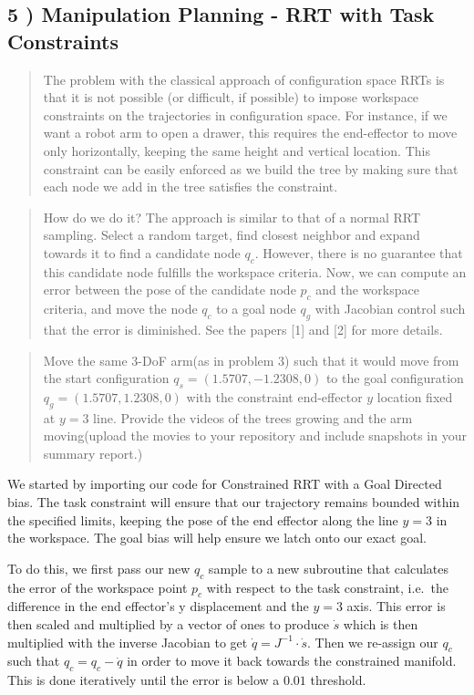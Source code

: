 \documentclass{article}
\begin{document}
    \subsection{5 ) Manipulation Planning - RRT with Task Constraints}


    \begin{quote}
The problem with the classical approach of configuration space RRTs is
that it is not possible (or difficult, if possible) to impose workspace
constraints on the trajectories in configuration space. For instance, if
we want a robot arm to open a drawer, this requires the end-effector to
move only horizontally, keeping the same height and vertical location.
This constraint can be easily enforced as we build the tree by making
sure that each node we add in the tree satisfies the constraint.
\end{quote}

\begin{quote}
How do we do it? The approach is similar to that of a normal RRT
sampling. Select a random target, find closest neighbor and expand
towards it to find a candidate node $q_c$. However, there is no
guarantee that this candidate node fulfills the workspace criteria. Now,
we can compute an error between the pose of the candidate node $p_c$ and
the workspace criteria, and move the node $q_c$ to a goal node $q_g$
with Jacobian control such that the error is diminished. See the papers
{[}1{]} and {[}2{]} for more details.
\end{quote}

\begin{quote}
Move the same $3$-DoF arm(as in problem 3) such that it would move from
the start configuration $q_s = ( 1.5707, -1.2308, 0 )$ to the goal
configuration $q_g = ( 1.5707, 1.2308, 0 )$ with the constraint
end-effector $y$ location fixed at $y = 3$ line. Provide the videos of
the trees growing and the arm moving(upload the movies to your
repository and include snapshots in your summary report.)
\end{quote}

    We started by importing our code for Constrained RRT with a Goal
Directed bias. The task constraint will ensure that our trajectory
remains bounded within the specified limits, keeping the pose of the end
effector along the line $y=3$ in the workspace. The goal bias will help
ensure we latch onto our exact goal.

To do this, we first pass our new $q_c$ sample to a new subroutine that
calculates the error of the workspace point $p_c$ with respect to the
task constraint, i.e.~the difference in the end effector's y
displacement and the $y=3$ axis. This error is then scaled and
multiplied by a vector of ones to produce $\dot{s}$ which is then
multiplied with the inverse Jacobian to get
$\dot{q} = J^{-1} \cdot \dot{s}$. Then we re-assign our $q_c$ such that
$q_c = q_c - \dot{q}$ in order to move it back towards the constrained
manifold. This is done iteratively until the error is below a $0.01$
threshold.
\end{document}
